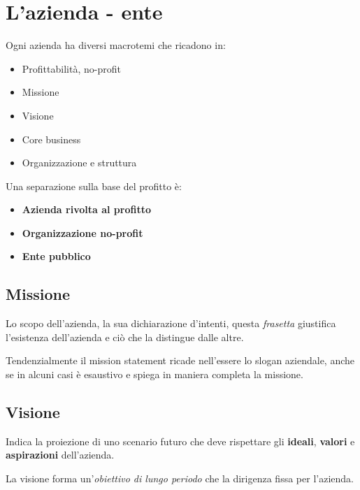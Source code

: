 


\chapter{L'azienda - ente}




Ogni azienda ha diversi macrotemi che ricadono in:
\begin{itemize}
  \item Profittabilità, no-profit
  \item Missione
  \item Visione
  \item Core business
  \item Organizzazione e struttura
\end{itemize}


Una separazione sulla base del profitto è:
\begin{itemize}
  \item \textbf{Azienda rivolta al profitto}
  \item \textbf{Organizzazione no-profit}
  \item \textbf{Ente pubblico}
\end{itemize}



\section{Missione}
Lo scopo dell'azienda, la sua dichiarazione d'intenti, questa \textit{frasetta} giustifica
l'esistenza dell'azienda e ci\`o che la distingue dalle altre.

Tendenzialmente il mission statement ricade nell'essere lo slogan aziendale,
anche se in alcuni casi è esaustivo e spiega in maniera completa la missione.


\section{Visione}

Indica la proiezione di uno scenario futuro che deve rispettare gli \textbf{ideali},
\textbf{valori} e \textbf{aspirazioni} dell'azienda.

La visione forma un'\textit{obiettivo di lungo periodo} che la dirigenza fissa per l'azienda.


